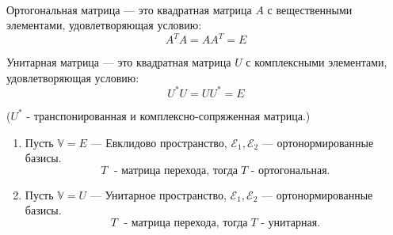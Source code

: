\begin{shdef}
    \begin{definition}
    \leavevmode \\

        Ортогональная матрица — это квадратная матрица $A$ с вещественными      элементами, удовлетворяющая условию: 
        $$A^T A = A A^T = E$$
        \nl 

        Унитарная матрица — это квадратная матрица $U$ с комплексными элементами, удовлетворяющая условию: 
        $$U^* U = U U^* = E$$
        \nl

        ($ U^* $ - транспонированная и комплексно-сопряженная матрица.)
    \end{definition}
\end{shdef}

\begin{shth}
\begin{theorem}
    \begin{enumerate}
    \leavevmode \nl 
    
        \item Пусть $\mathbb{V} = E$ — Евклидово пространство, $\mathcal{E}_1, \mathcal{E}_2$ — ортонормированные базисы. 
              $$T \; \text{ - матрица перехода, тогда} \; T \text{ - ортогональная}.$$
        \item Пусть $\mathbb{V} = U$ — Унитарное пространство, $\mathcal{E}_1, \mathcal{E}_2$ — ортонормированные базисы. 
              $$T \; \text{ - матрица перехода, тогда} \; T \text{ - унитарная}.$$
    \end{enumerate}
\end{theorem}
\end{shth}


